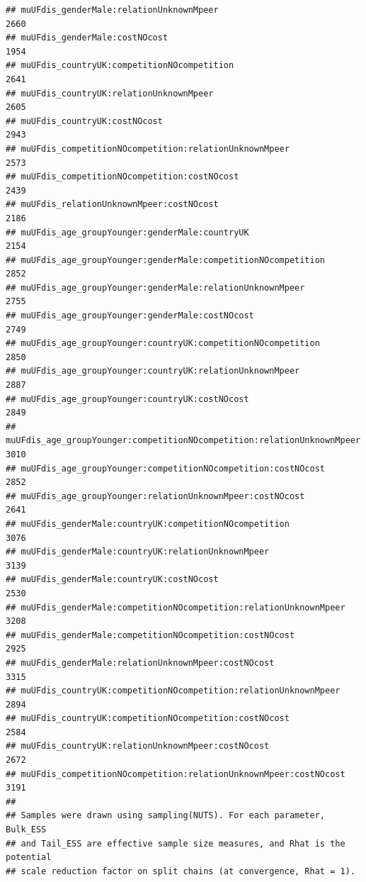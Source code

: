 \documentclass[
]{article}
\begin{document}
\begin{verbatim}
## muUFdis_genderMale:relationUnknownMpeer                                    2660
## muUFdis_genderMale:costNOcost                                              1954
## muUFdis_countryUK:competitionNOcompetition                                 2641
## muUFdis_countryUK:relationUnknownMpeer                                     2605
## muUFdis_countryUK:costNOcost                                               2943
## muUFdis_competitionNOcompetition:relationUnknownMpeer                      2573
## muUFdis_competitionNOcompetition:costNOcost                                2439
## muUFdis_relationUnknownMpeer:costNOcost                                    2186
## muUFdis_age_groupYounger:genderMale:countryUK                              2154
## muUFdis_age_groupYounger:genderMale:competitionNOcompetition               2852
## muUFdis_age_groupYounger:genderMale:relationUnknownMpeer                   2755
## muUFdis_age_groupYounger:genderMale:costNOcost                             2749
## muUFdis_age_groupYounger:countryUK:competitionNOcompetition                2850
## muUFdis_age_groupYounger:countryUK:relationUnknownMpeer                    2887
## muUFdis_age_groupYounger:countryUK:costNOcost                              2849
## muUFdis_age_groupYounger:competitionNOcompetition:relationUnknownMpeer     3010
## muUFdis_age_groupYounger:competitionNOcompetition:costNOcost               2852
## muUFdis_age_groupYounger:relationUnknownMpeer:costNOcost                   2641
## muUFdis_genderMale:countryUK:competitionNOcompetition                      3076
## muUFdis_genderMale:countryUK:relationUnknownMpeer                          3139
## muUFdis_genderMale:countryUK:costNOcost                                    2530
## muUFdis_genderMale:competitionNOcompetition:relationUnknownMpeer           3208
## muUFdis_genderMale:competitionNOcompetition:costNOcost                     2925
## muUFdis_genderMale:relationUnknownMpeer:costNOcost                         3315
## muUFdis_countryUK:competitionNOcompetition:relationUnknownMpeer            2894
## muUFdis_countryUK:competitionNOcompetition:costNOcost                      2584
## muUFdis_countryUK:relationUnknownMpeer:costNOcost                          2672
## muUFdis_competitionNOcompetition:relationUnknownMpeer:costNOcost           3191
## 
## Samples were drawn using sampling(NUTS). For each parameter, Bulk_ESS
## and Tail_ESS are effective sample size measures, and Rhat is the potential
## scale reduction factor on split chains (at convergence, Rhat = 1).
\end{verbatim}
\end{document}

